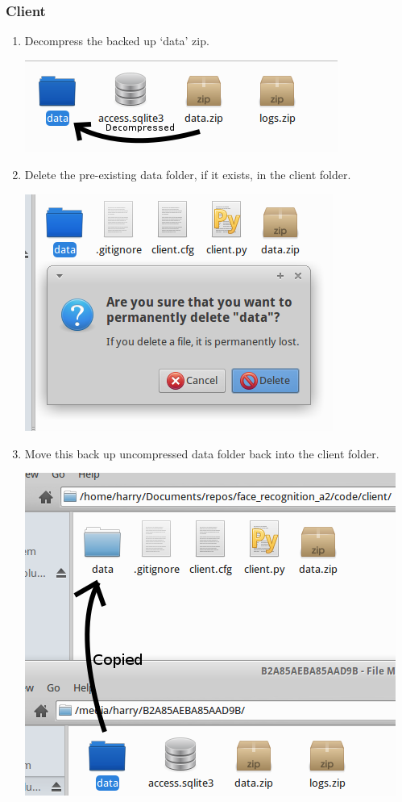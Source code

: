 \documentclass[a4paper]{article}
\begin{document}
        \subsubsection{Client}
            \begin{enumerate}
                \item Decompress the backed up `data' zip.
                \begin{center}
                \includegraphics[scale=0.7]{../shared_assets/screenshots/manual/decompressedclient.png}
                \end{center}
                \item Delete the pre-existing data folder, if it exists, in the client folder.
                \begin{center}
                \includegraphics[scale=0.7]{../shared_assets/screenshots/manual/deleteclientdata.png}
                \end{center}
                \item Move this back up uncompressed data folder back into the client folder.
                \begin{center}
                \includegraphics[scale=0.6]{../shared_assets/screenshots/manual/restoreclient.png}

\end{center}
\end{enumerate}
\end{document}
